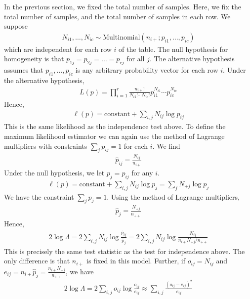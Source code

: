 \begin{example}
	In the previous section, we fixed the total number of samples.
	Here, we fix the total number of samples, and the total number of samples in each row.
	We suppose
	\begin{align*}
		N_{i1}, \dots, N_{ic} \sim \mathrm{Multinomial}(n_{i+}; p_{i1}, \dots, p_{ic})
	\end{align*}
	which are independent for each row $i$ of the table.
	The null hypothesis for homogeneity is that $p_{1j} = p_{2j} = \dots = p_{rj}$ for all $j$.
	The alternative hypothesis assumes that $p_{i1}, \dots, p_{ic}$ is any arbitrary probability vector for each row $i$.
	Under the alternative hypothesis,
	\begin{align*}
		L(p) = \prod_{i=1}^r \frac{n_{i+}!}{N_{i1}!
			\cdots N_{ic}!} p_{i1}^{N_{i1}} \cdots p_{ic}^{N_{ic}}
	\end{align*}
	Hence,
	\begin{align*}
		\ell(p) = \text{constant} + \sum_{i,j} N_{ij} \log p_{ij}
	\end{align*}
	This is the same likelihood as the independence test above.
	To define the maximum likelihood estimator we can again use the method of Lagrange multipliers with constraints $\sum_j p_{ij} = 1$ for each $i$.
	We find
	\begin{align*}
		\hat p_{ij} = \frac{N_{ij}}{n_{i+}}
	\end{align*}
	Under the null hypothesis, we let $p_j = p_{ij}$ for any $i$.
	\begin{align*}
		\ell(p) = \text{constant} + \sum_{i,j} N_{ij} \log p_j = \sum_j N_{+j} \log p_j
	\end{align*}
	We have the constraint $\sum_j p_j = 1$.
	Using the method of Lagrange multipliers,
	\begin{align*}
		\hat p_j = \frac{N_{+j}}{n_{++}}
	\end{align*}
	Hence,
	\begin{align*}
		2 \log \Lambda = 2 \sum_{i,j} N_{ij} \log \frac{\hat p_{ij}}{\hat p_j} = 2 \sum_{i,j} N_{ij} \log \frac{N_{ij}}{n_{i+} N_{+j} / n_{++}}
	\end{align*}
	This is precisely the same test statistic as the test for independence above.
	The only difference is that $n_{i+}$ is fixed in this model.
	Further, if $o_{ij} = N_{ij}$ and $e_{ij} = n_{i+} \hat p_j = \frac{n_{i+} N_{+j}}{n_{++}}$, we have
	\begin{align*}
		2 \log \Lambda = 2 \sum_{i,j} o_{ij} \log \frac{o_{ij}}{e_{ij}} \approx \sum_{i,j} \frac{(o_{ij} - e_{ij})^2}{e_{ij}}
	\end{align*}

\end{example}
